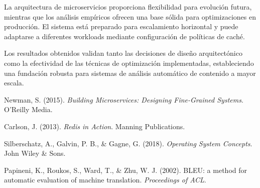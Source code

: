 \documentclass[12pt,a4paper]{article}
\begin{document}
La arquitectura de microservicios proporciona flexibilidad para evolución futura, mientras que los análisis empíricos ofrecen una base sólida para optimizaciones en producción. El sistema está preparado para escalamiento horizontal y puede adaptarse a diferentes workloads mediante configuración de políticas de caché.

Los resultados obtenidos validan tanto las decisiones de diseño arquitectónico como la efectividad de las técnicas de optimización implementadas, estableciendo una fundación robusta para sistemas de análisis automático de contenido a mayor escala.

\begin{thebibliography}{9}

Newman, S. (2015). \textit{Building Microservices: Designing Fine-Grained Systems}. O'Reilly Media.

Carlson, J. (2013). \textit{Redis in Action}. Manning Publications.

Silberschatz, A., Galvin, P. B., \& Gagne, G. (2018). \textit{Operating System Concepts}. John Wiley \& Sons.

Papineni, K., Roukos, S., Ward, T., \& Zhu, W. J. (2002). BLEU: a method for automatic evaluation of machine translation. \textit{Proceedings of ACL}.

\end{thebibliography}
\end{document}
